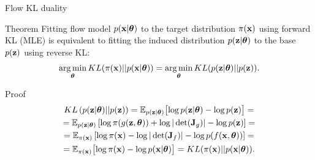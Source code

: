 \begin{frame}{Flow KL duality}
	\begin{block}{Theorem}
		Fitting flow model $p(\mathbf{x}| \boldsymbol{\theta})$ to the target distribution $\pi(\mathbf{x})$ using forward KL (MLE) is equivalent to fitting the induced distribution $p(\mathbf{z}| \boldsymbol{\theta})$ to the base $p(\mathbf{z})$ using reverse KL:
		\[
			\operatorname*{arg\,min}_{\boldsymbol{\theta}} KL(\pi(\mathbf{x}) || p(\mathbf{x} | \boldsymbol{\theta})) = \operatorname*{arg\,min}_{\boldsymbol{\theta}} KL(p(\mathbf{z} | \boldsymbol{\theta}) || p(\mathbf{z})).
		\]
		\vspace{-0.7cm}
	\end{block}
	\begin{block}{Proof}
		\vspace{-0.7cm}
		\begin{multline*}
			KL\left(p(\mathbf{z} | \boldsymbol{\theta}) || p(\mathbf{z}) \right) = \mathbb{E}_{p(\mathbf{z} | \boldsymbol{\theta})} \bigl[ \log p(\mathbf{z} | \boldsymbol{\theta}) - \log p(\mathbf{z}) \bigr] = \\ 
			= \mathbb{E}_{p(\mathbf{z} | \boldsymbol{\theta})} \left[ \log \pi(g(\mathbf{z}, \boldsymbol{\theta})) +  \log |\det (\mathbf{J}_g)| - \log p(\mathbf{z}) \right] = \\
			= \mathbb{E}_{\pi(\mathbf{x})} \left[ \log \pi(\mathbf{x}) -  \log |\det (\mathbf{J}_f)| - \log p(f(\mathbf{x}, \boldsymbol{\theta})) \right] = \\
			= \mathbb{E}_{\pi(\mathbf{x})} \bigl[ \log \pi(\mathbf{x}) - \log p(\mathbf{x} | \boldsymbol{\theta}) \bigr] = KL (\pi(\mathbf{x}) || p(\mathbf{x} | \boldsymbol{\theta})).
		\end{multline*}
	\end{block}
\end{frame}
